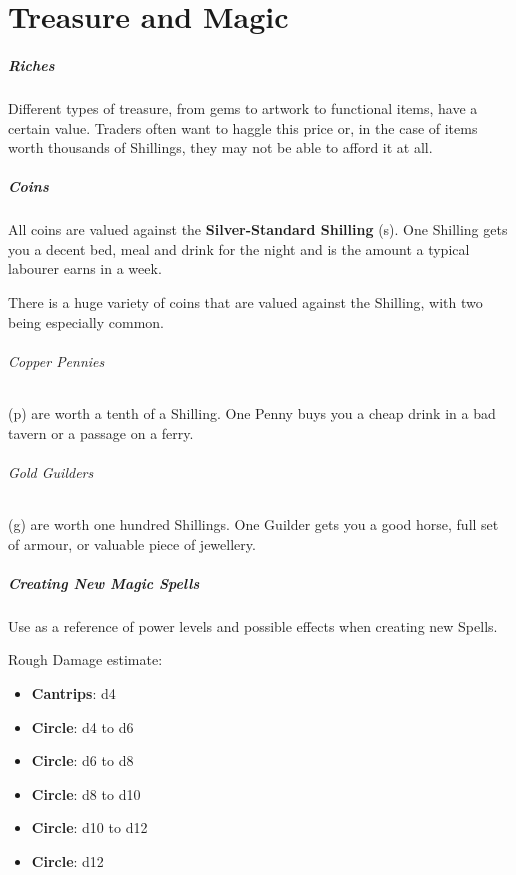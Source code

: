 \documentclass[itdr]{subfiles}
\begin{document}
\chapter{Treasure and Magic}
\label{ch:treasure_and_magic}

\paragraph{Riches}
Different types of treasure, from gems to artwork to functional items, have a certain value. Traders often want to haggle this price or, in the case of items worth thousands of Shillings, they may not be able to afford it at all.

\paragraph{Coins}
All coins are valued against the \textbf{Silver-Standard Shilling} (s). One Shilling gets you a decent bed, meal and drink for the night and is the amount a typical labourer earns in a week.

There is a huge variety of coins that are valued against the Shilling, with two being especially common.

\subparagraph{Copper Pennies} (p) are worth a tenth of a Shilling. One Penny buys you a cheap drink in a bad tavern or a passage on a ferry.

\subparagraph{Gold Guilders} (g) are worth one hundred Shillings. One Guilder gets you a good horse, full set of armour, or valuable piece of jewellery.

\vfill

\paragraph{Creating New Magic Spells}
Use \textbf{} as a reference of power levels and possible effects when creating new Spells.

Rough Damage estimate:
\begin{itemize}
	\item \textbf{Cantrips}: d4
	\item \textbf{ Circle}: d4 to d6
	\item \textbf{ Circle}: d6 to d8
	\item \textbf{ Circle}: d8 to d10
	\item \textbf{ Circle}: d10 to d12
	\item \textbf{ Circle}: d12
\end{itemize}
\end{document}
